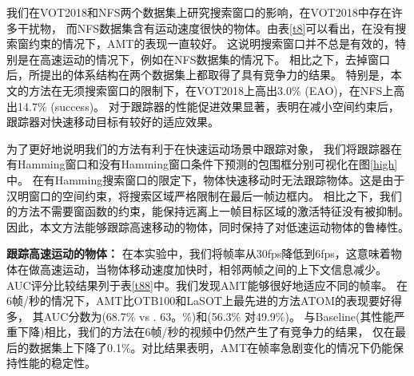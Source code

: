 \documentclass[promaster]{thesis-uestc}
\begin{document}
我们在VOT2018和NFS两个数据集上研究搜索窗口的影响，在VOT2018中存在许多干扰物，
而NFS数据集含有运动速度很快的物体。由表\ref{t8}可以看出，在没有搜索窗约束的情况下，AMT的表现一直较好。
这说明搜索窗口并不总是有效的，特别是在高速运动的情况下，例如在NFS数据集的情况下。
相比之下，去掉窗口后，所提出的体系结构在两个数据集上都取得了具有竞争力的结果。
特别是，本文的方法在无须搜索窗口的限制下，在VOT2018上高出3.0\% (EAO)，在NFS上高出14.7\% (success)。
对于跟踪器的性能促进效果显著，表明在减小空间约束后，跟踪器对快速移动目标有较好的适应效果。

\begin{table}[htp!]
    \centering
    \caption{AMT在有无Hamming搜索框限制下的性能表现。 'HM' 表示的是有Hamming 搜索窗口。
     }
    \vspace{2mm}
    \label{t8}
\end{table}

为了更好地说明我们的方法有利于在快速运动场景中跟踪对象，
我们将跟踪器在有Hamming窗口和没有Hamming窗口条件下预测的包围框分别可视化在图\ref{high}中。
在有Hamming搜索窗口的限定下，物体快速移动时无法跟踪物体。这是由于汉明窗口的空间约束，将搜索区域严格限制在最后一帧边框内。
相比之下，我们的方法不需要窗函数的约束，能保持远离上一帧目标区域的激活特征没有被抑制。因此，本文方法能够跟踪高速移动的物体，同时保持了对低速运动物体的鲁棒性。


\textbf{跟踪高速运动的物体：}
在本实验中，我们将帧率从30fps降低到6fps，这意味着物体在做高速运动，当物体移动速度加快时，相邻两帧之间的上下文信息减少。
AUC评分比较结果列于表\ref{t88}中。我们发现AMT能够很好地适应不同的帧率。
在6帧/秒的情况下，AMT比OTB100和LaSOT上最先进的方法ATOM的表现要好得多，
其AUC分数为(68.7\% vs . 63。\%)和(56.3\% 对49.9\%)。
与Baseline(其性能严重下降)相比，我们的方法在6帧/秒的视频中仍然产生了有竞争力的结果，
仅在最后的数据集上下降了0.1\%。对比结果表明，AMT在帧率急剧变化的情况下仍能保持性能的稳定性。
\end{document}

